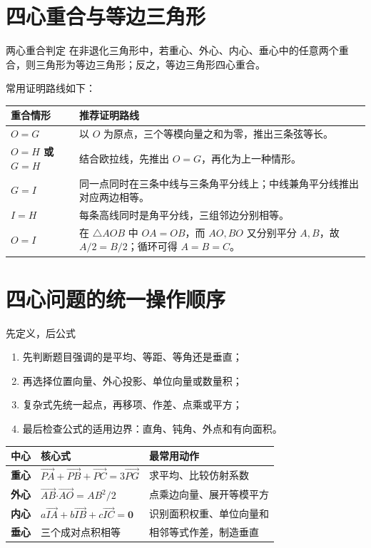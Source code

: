 \documentclass[11pt,a4paper,openany]{ctexbook}
\newcommand{\vect}[1]{\overrightarrow{#1}}
\newcommand{\vv}[1]{\bm{#1}}
\newcommand{\dotp}{\mathbin{\boldsymbol\cdot}}
\begin{document}
\section{四心重合与等边三角形}
\begin{theorembox}{两心重合判定}
在非退化三角形中，若重心、外心、内心、垂心中的任意两个重合，则三角形为等边三角形；反之，等边三角形四心重合。
\end{theorembox}

常用证明路线如下：
\begin{center}
\begin{tabularx}{.94\textwidth}{>{\bfseries}p{3.1cm}X}
\toprule
重合情形 & 推荐证明路线\\
\midrule
\(O=G\) & 以 \(O\) 为原点，三个等模向量之和为零，推出三条弦等长。\\
\(O=H\) 或 \(G=H\) & 结合欧拉线，先推出 \(O=G\)，再化为上一种情形。\\
\(G=I\) & 同一点同时在三条中线与三条角平分线上；中线兼角平分线推出对应两边相等。\\
\(I=H\) & 每条高线同时是角平分线，三组邻边分别相等。\\
\(O=I\) & 在 \(\triangle AOB\) 中 \(OA=OB\)，而 \(AO,BO\) 又分别平分 \(A,B\)，故 \(A/2=B/2\)；循环可得 \(A=B=C\)。\\
\bottomrule
\end{tabularx}
\end{center}

\section{四心问题的统一操作顺序}
\begin{summarybox}{先定义，后公式}
\begin{enumerate}
  \item 先判断题目强调的是平均、等距、等角还是垂直；
  \item 再选择位置向量、外心投影、单位向量或数量积；
  \item 复杂式先统一起点，再移项、作差、点乘或平方；
  \item 最后检查公式的适用边界：直角、钝角、外点和有向面积。
\end{enumerate}
\end{summarybox}

\begin{center}
\begin{tabularx}{.96\textwidth}{>{\bfseries}p{2.3cm}p{4.5cm}X}
\toprule
中心 & 核心式 & 最常用动作\\
\midrule
重心 & \(\vect{PA}+\vect{PB}+\vect{PC}=3\vect{PG}\) & 求平均、比较仿射系数\\
外心 & \(\vect{AB}\dotp\vect{AO}=AB^2/2\) & 点乘边向量、展开等模平方\\
内心 & \(a\vect{IA}+b\vect{IB}+c\vect{IC}=\vv0\) & 识别面积权重、单位向量和\\
垂心 & 三个成对点积相等 & 相邻等式作差，制造垂直\\
\bottomrule
\end{tabularx}
\end{center}
\end{document}
